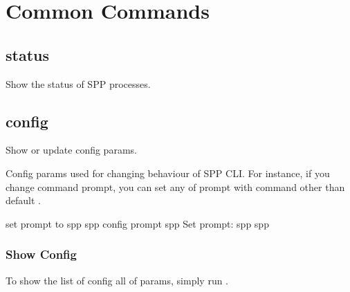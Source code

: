 \documentclass[a4paper,11pt,openany,oneside,english]{sphinxmanual}
\begin{document}
\section{Common Commands}
\label{\detokenize{commands/common:common-commands}}\label{\detokenize{commands/common:commands-common}}\label{\detokenize{commands/common::doc}}

\subsection{status}
\label{\detokenize{commands/common:status}}\label{\detokenize{commands/common:commands-common-status}}
Show the status of SPP processes.

\begin{sphinxVerbatim}[commandchars=\\\{\},formatcom=\footnotesize]
\end{sphinxVerbatim}


\subsection{config}
\label{\detokenize{commands/common:config}}\label{\detokenize{commands/common:commands-common-config}}
Show or update config params.

Config params used for changing behaviour of SPP CLI. For instance, if you
change command prompt, you can set any of prompt with  command
other than default .

\begin{sphinxVerbatim}[commandchars=\\\{\},formatcom=\footnotesize]
\PYGZsh{} set prompt to \PYGZdq{}\PYGZdl{} spp \PYGZdq{}
spp \PYGZgt{} config prompt \PYGZdq{}\PYGZdl{} spp \PYGZdq{}
Set prompt: \PYGZdq{}\PYGZdl{} spp \PYGZdq{}
\PYGZdl{} spp
\end{sphinxVerbatim}


\subsubsection{Show Config}
\label{\detokenize{commands/common:show-config}}
To show the list of config all of params, simply run .
\end{document}

